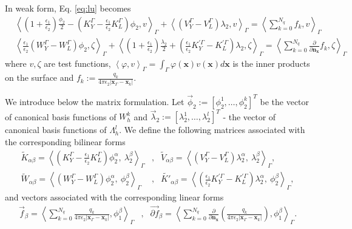 In weak form, Eq. \eqref{eq:lu} becomes
%
\begin{align}\label{eq:lu_disc}
&\left< \left(1+\tfrac{\epsilon_1}{\epsilon_2}\right) \tfrac{\phi_{2}}{2} - \left(K_Y^\Gamma - \tfrac{\epsilon_1}{\epsilon_2}K_L^\Gamma\right)\phi_{2}, v \right>_{\Gamma} + \left< \left(V_Y^\Gamma - V_L^\Gamma\right) \lambda_2, v \right>_\Gamma = \left< \sum_{k=0}^{N_q}  f_k, v \right>_{\Gamma} \nonumber \\
&\left< \tfrac{\epsilon_1}{\epsilon_2}\left(W_Y^\Gamma - W_L^\Gamma\right)\phi_{2}, \zeta \right>_\Gamma + \left<  \left(1+\tfrac{\epsilon_1}{\epsilon_2}\right) \tfrac{\lambda_2}{2} + \left(\tfrac{\epsilon_1}{\epsilon_2}K_Y^{\prime\Gamma} - K_L^{\prime\Gamma}\right)\lambda_2, \zeta\right>_\Gamma = \left< \sum_{k=0}^{N_q}  \frac{\partial}{\partial\mathbf{n}_\mathbf{x}} f_k, \zeta \right>_{\Gamma}
\end{align}
%
where $v, \zeta$ are test functions, $\left<\varphi,v\right>_\Gamma = \int_\Gamma \varphi(\mathbf{x})v(\mathbf{x})d\mathbf{x}$ %
is the inner products on the surface%
and $f_k := \frac{q_k}{4\pi\epsilon_2|\mathbf{x}_{\Gamma} - \mathbf{x}_k|}$.

We introduce below the matrix formulation. Let $\vec{\phi}_2 := [\phi_2^1, \dots, \phi_2^k]^T$ be the vector of canonical basis
functions of $W_{h}^{k}$ and  $\vec{\lambda}_2 := [\lambda_2^1, \dots, \lambda_2^l]^T$ - the vector of canonical basis
functions of $\Lambda_{h}^{l}$. We define the following matrices associated with the corresponding bilinear forms
\begin{align*}
\widetilde{K}_{\alpha \beta} = \left<\left(K_Y^\Gamma - \tfrac{\epsilon_1}{\epsilon_2}K_L^\Gamma\right) \phi^{\alpha}_2, \ \lambda^{\beta}_2 \right>_{\Gamma}
 &,&
\widetilde{V}_{\alpha \beta} = \left<\left(V_Y^\Gamma - V_L^\Gamma\right) \lambda^{\alpha}_2, \ \lambda^{\beta}_2 \right>_{\Gamma}, \\
\widetilde{W}_{\alpha \beta} = \left<\left(W_Y^\Gamma - W_L^\Gamma\right) \phi^{\alpha}_2, \ \phi^{\beta}_2 \right>_{\Gamma}
 &,&
\widetilde{K'}_{\alpha \beta} = \left<\left(\tfrac{\epsilon_1}{\epsilon_2}K_Y^{\prime\Gamma} - K_L^{\prime\Gamma}\right) \lambda^{\alpha}_2, \ \phi^{\beta}_2 \right>_{\Gamma},
\end{align*}
and vectors associated with the corresponding linear forms
\begin{align*}
\vec{f}_{\beta} = \left< \sum_{k=0}^{N_q}  \frac{q_k}{4\pi\epsilon_2|\mathbf{x}_{\Gamma} - \mathbf{x}_k|},   \phi^{\beta}_1  \right>_{\Gamma} &,& \vec{\partial f}_{\beta} = \left< \sum_{k=0}^{N_q}  \frac{\partial}{\partial\mathbf{n}_\mathbf{x}}\left(\frac{q_k}{4\pi\epsilon_2|\mathbf{x}_{\Gamma} - \mathbf{x}_k|}\right),   \phi^{\beta}_1  \right>_{\Gamma}.
\end{align*}

